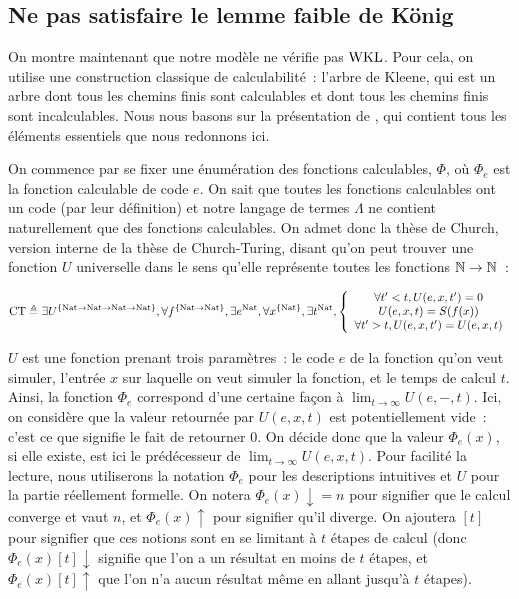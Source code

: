 \documentclass{article}
\begin{document}
\subsection[Lemme faible de König]{Ne pas satisfaire le lemme faible de König}

On montre maintenant que notre modèle ne vérifie pas $\mathrm{WKL}$. Pour cela, on utilise une construction classique de calculabilité~: l'arbre de Kleene, qui est un arbre dont tous les chemins finis sont calculables et dont tous les chemins finis sont incalculables. Nous nous basons sur la présentation de \cite{bauer-kleene-tree}, qui contient tous les éléments essentiels que nous redonnons ici.

On commence par se fixer une énumération des fonctions calculables, $\Phi$, où $\Phi_e$ est la fonction calculable de code $e$. On sait que toutes les fonctions calculables ont un code (par leur définition) et notre langage de termes $\Lambda$ ne contient naturellement que des fonctions calculables. On admet donc la thèse de Church, version interne de la thèse de Church-Turing, disant qu'on peut trouver une fonction $U$ universelle dans le sens qu'elle représente toutes les fonctions $\mathbb{N} \to \mathbb{N}$~:

\[\mathrm{CT} \triangleq\exists U^{\{\mathrm{Nat}\to\mathrm{Nat}\to\mathrm{Nat}\to\mathrm{Nat}\}}, \forall f^{\{\mathrm{Nat}\to\mathrm{Nat}\}}, \exists e^{\mathrm{Nat}}, \forall x^{\{\mathrm{Nat}\}}, \exists t^{\mathrm{Nat}},
  \left\{\begin{array}{c}
  \forall t' < t, U(e,x,t') = 0\\
  U(e,x,t) = S(f(x))\\
  \forall t' > t, U(e,x,t') = U(e,x,t)
  \end{array}\right.\]

$U$ est une fonction prenant trois paramètres~: le code $e$ de la fonction qu'on veut simuler, l'entrée $x$ sur laquelle on veut simuler la fonction, et le temps de calcul $t$. Ainsi, la fonction $\Phi_e$ correspond d'une certaine  façon à $\lim_{t \to \infty} U(e,-,t)$. Ici, on considère que la valeur retournée par $U(e,x,t)$ est potentiellement vide~: c'est ce que signifie le fait de retourner $0$. On décide donc que la valeur $\Phi_e(x)$, si elle existe, est ici le prédécesseur de $\lim_{t \to\infty} U(e,x,t)$. Pour facilité la lecture, nous utiliserons la notation $\Phi_e$ pour les descriptions intuitives et $U$ pour la partie réellement formelle. On notera $\Phi_e(x) \downarrow= n$ pour signifier que le calcul converge et vaut $n$, et $\Phi_e(x) \uparrow$ pour signifier qu'il diverge. On ajoutera $[t]$ pour signifier que ces notions sont en se limitant à $t$ étapes de calcul (donc $\Phi_e(x)[t]\downarrow$ signifie que l'on a un résultat en moins de $t$ étapes, et $\Phi_e(x)[t]\uparrow$ que l'on n'a aucun résultat même en allant jusqu'à $t$ étapes).
\end{document}
